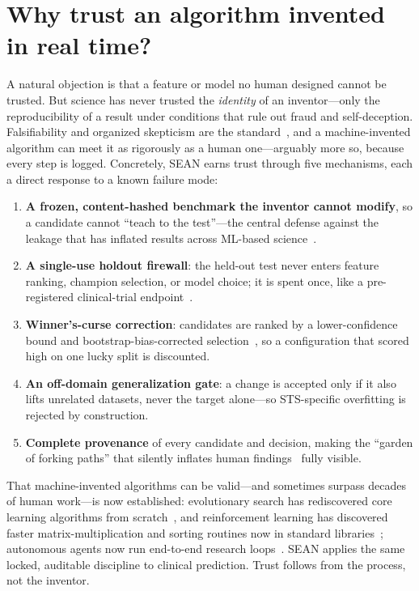 \documentclass[11pt]{article}
\newcommand{\sean}{SEAN}
\begin{document}
\section{Why trust an algorithm invented in real time?}
A natural objection is that a feature or model no human designed cannot be trusted. But science
has never trusted the \emph{identity} of an inventor---only the reproducibility of a result
under conditions that rule out fraud and self-deception. Falsifiability and organized
skepticism are the standard~\cite{popper1959,merton1973}, and a machine-invented algorithm can
meet it as rigorously as a human one---arguably more so, because every step is logged.
Concretely, \sean{} earns trust through five mechanisms, each a direct response to a known
failure mode:
\begin{enumerate}\itemsep1pt
\item \textbf{A frozen, content-hashed benchmark the inventor cannot modify}, so a candidate
cannot ``teach to the test''---the central defense against the leakage that has inflated
results across ML-based science~\cite{kapoor2023}.
\item \textbf{A single-use holdout firewall}: the held-out test never enters feature ranking,
champion selection, or model choice; it is spent once, like a pre-registered clinical-trial
endpoint~\cite{collins2024}.
\item \textbf{Winner's-curse correction}: candidates are ranked by a lower-confidence bound and
bootstrap-bias-corrected selection~\cite{tsamardinos2018}, so a configuration that scored high
on one lucky split is discounted.
\item \textbf{An off-domain generalization gate}: a change is accepted only if it also lifts
unrelated datasets, never the target alone---so STS-specific overfitting is rejected by
construction.
\item \textbf{Complete provenance} of every candidate and decision, making the ``garden of
forking paths'' that silently inflates human findings~\cite{gelman2014} fully visible.
\end{enumerate}
That machine-invented algorithms can be valid---and sometimes surpass decades of human
work---is now established: evolutionary search has rediscovered core learning algorithms from
scratch~\cite{real2020}, and reinforcement learning has discovered faster matrix-multiplication
and sorting routines now in standard libraries~\cite{fawzi2022,mankowitz2023}; autonomous
agents now run end-to-end research loops~\cite{lu2024}. \sean{} applies the same locked,
auditable discipline to clinical prediction. Trust follows from the process, not the inventor.
\end{document}
